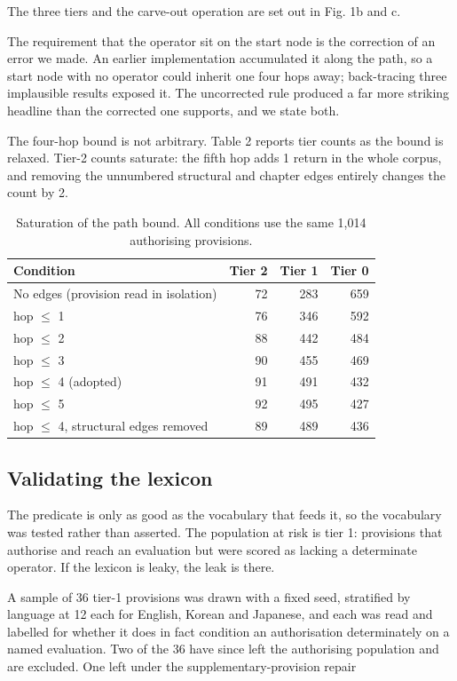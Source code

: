 The three tiers and the carve-out operation are set out in Fig. 1b and c.

The requirement that the operator sit on the start node is the correction of an error we made. An earlier implementation accumulated it along the path, so a start node with no operator could inherit one four hops away; back-tracing three implausible results exposed it. The uncorrected rule produced a far more striking headline than the corrected one supports, and we state both.

The four-hop bound is not arbitrary. Table 2 reports tier counts as the bound is relaxed. Tier-2 counts saturate: the fifth hop adds 1 return in the whole corpus, and removing the unnumbered structural and chapter edges entirely changes the count by 2.

\begin{table}[!htb]
\centering
\caption{Saturation of the path bound. All conditions use the same 1,014 authorising provisions.}
\label{tab:t2}
\small
\begin{tabular}{@{}lrrr@{}}
\toprule
Condition & Tier 2 & Tier 1 & Tier 0 \\
\midrule
No edges (provision read in isolation) & 72 & 283 & 659 \\
hop $\le$ 1 & 76 & 346 & 592 \\
hop $\le$ 2 & 88 & 442 & 484 \\
hop $\le$ 3 & 90 & 455 & 469 \\
hop $\le$ 4 (adopted) & 91 & 491 & 432 \\
hop $\le$ 5 & 92 & 495 & 427 \\
hop $\le$ 4, structural edges removed & 89 & 489 & 436 \\
\bottomrule
\end{tabular}
\end{table}

\subsection{Validating the lexicon}\label{sec:2.6}

The predicate is only as good as the vocabulary that feeds it, so the vocabulary was tested rather than asserted. The population at risk is tier 1: provisions that authorise and reach an evaluation but were scored as lacking a determinate operator. If the lexicon is leaky, the leak is there.

A sample of 36 tier-1 provisions was drawn with a fixed seed, stratified by language at 12 each for English, Korean and Japanese, and each was read and labelled for whether it does in fact condition an authorisation determinately on a named evaluation. Two of the 36 have since left the authorising population and are excluded. One left under the supplementary-provision repair

